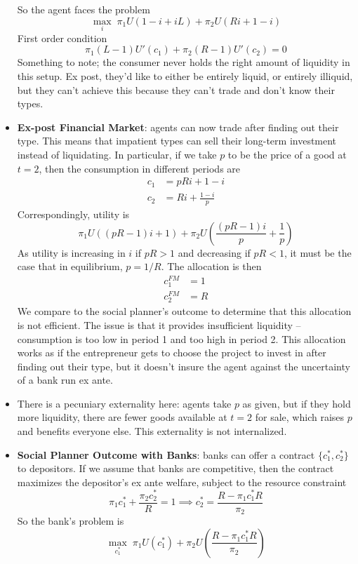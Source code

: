 \documentclass[12pt]{article}
\begin{document}
\begin{itemize}
    So the agent faces the problem
    \[\max_i\; \pi_1U(1-i+iL) + \pi_2U(Ri + 1-i)\]
    First order condition
    \[\pi_1(L-1)U'(c_1) + \pi_2(R-1)U'(c_2) = 0\]
    Something to note; the consumer never holds the right amount of liquidity in this setup. Ex post, they'd like to either be entirely liquid, or entirely illiquid, but they can't achieve this because they can't trade and don't know their types.
    \item \textbf{Ex-post Financial Market}: agents can now trade after finding out their type. This means that impatient types can sell their long-term investment instead of liquidating. In particular, if we take $p$ to be the price of a good at $t=2$, then the consumption in different periods are
    \[\begin{split}
        c_1 &= pRi + 1-i \\
        c_2 &= Ri + \frac{1-i}{p}
    \end{split}\]
    Correspondingly, utility is
    \[\pi_1U((pR-1)i + 1) + \pi_2U\left(\frac{(pR-1)i}{p} + \frac{1}{p}\right)\]
    As utility is increasing in $i$ if $pR > 1$ and decreasing if $pR < 1$, it must be the case that in equilibrium, $p=1/R$. The allocation is then 
    \[\begin{split}
        c_1^{FM} &= 1 \\
        c_2^{FM} &= R
    \end{split}\]
    We compare to the social planner's outcome to determine that this allocation is not efficient. The issue is that it provides insufficient liquidity -- consumption is too low in period 1 and too high in period 2. This allocation works as if the entrepreneur gets to choose the project to invest in after finding out their type, but it doesn't insure the agent against the uncertainty of a bank run ex ante.
    \item There is a pecuniary externality here: agents take $p$ as given, but if they hold more liquidity, there are fewer goods available at $t=2$ for sale, which raises $p$ and benefits everyone else. This externality is not internalized.
    \item \textbf{Social Planner Outcome with Banks}: banks can offer a contract $\{c_1^*, c_2^*\}$ to depositors. If we assume that banks are competitive, then the contract maximizes the depositor's ex ante welfare, subject to the resource constraint
    \[\pi_1c_1^* + \frac{\pi_2c_2^*}{R} = 1 \implies c_2^* = \frac{R-\pi_1c_1^*R}{\pi_2}\]
    So the bank's problem is
    \[\max_{c_1^*}\; \pi_1U(c_1^*) + \pi_2U\left(\frac{R-\pi_1c_1^*R}{\pi_2}\right)\]

\end{itemize}
\end{document}
